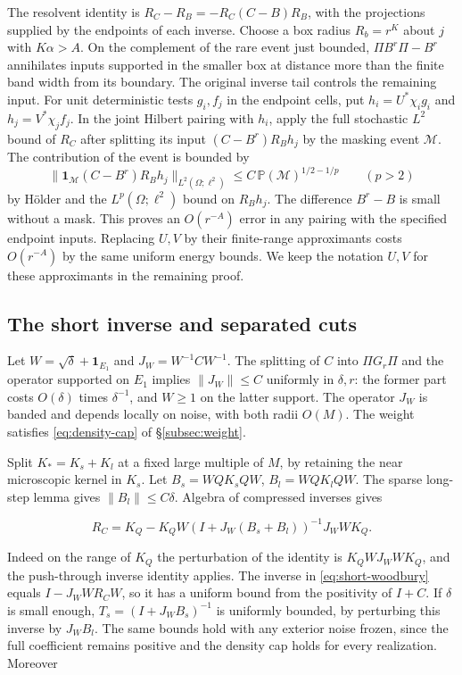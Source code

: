 \documentclass[11pt]{article}
\begin{document}
The resolvent identity is \(R_C-R_B=-R_C(C-B)R_B\), with the projections supplied by the endpoints of each inverse. Choose a box radius \(R_b=r^K\) about \(j\) with \(K\alpha>A\). On the complement of the rare event just bounded, \(\Pi B^r\Pi-B^r\) annihilates inputs supported in the smaller box at distance more than the finite band width from its boundary. The original inverse tail controls the remaining input. For unit deterministic tests \(g_i,f_j\) in the endpoint cells, put \(h_i=U^*\chi_i g_i\) and \(h_j=V^*\chi_j f_j\). In the joint Hilbert pairing with \(h_i\), apply the full stochastic \(L^2\) bound of \(R_C\) after splitting its input \((C-B^r)R_B h_j\) by the masking event \(\mathcal M\). The contribution of the event is bounded by
\[
 \|\mathbf1_{\mathcal M}(C-B^r)R_B h_j\|_{L^2(\Omega;\ell^2)}
 \le C\,\mathbb P(\mathcal M)^{1/2-1/p}\qquad(p>2)
\]
by Hölder and the \(L^p(\Omega;\ell^2)\) bound on \(R_Bh_j\). The difference \(B^r-B\) is small without a mask. This proves an \(O(r^{-A})\) error in any pairing with the specified endpoint inputs. Replacing \(U,V\) by their finite-range approximants costs \(O(r^{-A})\) by the same uniform energy bounds. We keep the notation \(U,V\) for these approximants in the remaining proof.

\subsection{The short inverse and separated cuts}\label{subsec:joint}

Let \(W=\sqrt\delta+\mathbf1_{E_1}\) and \(J_W=W^{-1} C W^{-1}\). The splitting of \(C\) into \(\Pi G_r\Pi\) and the operator supported on \(E_1\) implies \(\|J_W\|\le C\) uniformly in \(\delta,r\): the former part costs \(O(\delta)\) times \(\delta^{-1}\), and \(W\ge1\) on the latter support. The operator \(J_W\) is banded and depends locally on noise, with both radii \(O(M)\). The weight satisfies \eqref{eq:density-cap} of \S\ref{subsec:weight}.

Split \(K_*=K_s+K_l\) at a fixed large multiple of \(M\), by retaining the near microscopic kernel in \(K_s\). Let \(B_s=WQK_s QW\), \(B_l=WQK_l QW\). The sparse long-step lemma gives \(\|B_l\|\le C\delta\). Algebra of compressed inverses gives

\begin{equation}\label{eq:short-woodbury}
R_C=K_Q-K_Q W(I+J_W(B_s+B_l))^{-1}J_W W K_Q .
\end{equation}

Indeed on the range of \(K_Q\) the perturbation of the identity is \(K_Q W J_W W K_Q\), and the push-through inverse identity applies. The inverse in \eqref{eq:short-woodbury} equals \(I-J_W W R_C W\), so it has a uniform bound from the positivity of \(I+C\). If \(\delta\) is small enough, \(T_s=(I+J_W B_s)^{-1}\) is uniformly bounded, by perturbing this inverse by \(J_W B_l\). The same bounds hold with any exterior noise frozen, since the full coefficient remains positive and the density cap holds for every realization. Moreover
\end{document}
